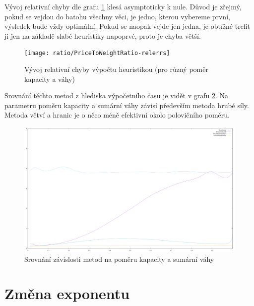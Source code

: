 \documentclass[12pt,a4paper]{article}
\begin{document}
Vývoj relativní chyby dle grafu \ref{ratio/PriceToWeightRatio-relerrs} klesá asymptoticky k nule. Důvod je zřejmý, pokud se vejdou do batohu všechny věci, je jedno, kterou vybereme první, výsledek bude vždy optimální. Pokud se naopak vejde jen jedna, je obtížné trefit ji jen na základě slabé heuristiky napoprvé, proto je chyba větší.

\begin{figure}[H]
\begin{center}
\texttt{[image: ratio/PriceToWeightRatio-relerrs]}
\caption{Vývoj relativní chyby výpočtu heuristikou (pro různý poměr kapacity a váhy)}
\label{ratio/PriceToWeightRatio-relerrs}
\end{center}
\end{figure}

Srovnání těchto metod z hlediska výpočetního času je vidět v grafu \ref{ratio/allExecTimes}. Na parametru poměru kapacity a sumární váhy závisí především metoda hrubé síly. Metoda větví a hranic je o něco méně efektivní okolo polovičního poměru.

\begin{figure}[H]
\begin{center}
\includegraphics[width=\textwidth]{ratio/allExecTimes}
\caption{Srovnání závislosti metod na poměru kapacity a sumární váhy}
\label{ratio/allExecTimes}
\end{center}
\end{figure}







\section{Změna exponentu}
\end{document}
